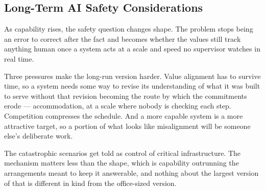 \subsection{Long-Term AI Safety Considerations}
\label{sec:6.3.5}
As capability rises, the safety question changes shape. The problem stops being an error to correct after the fact and becomes whether the values still track anything human once a system acts at a scale and speed no supervisor watches in real time.

Three pressures make the long-run version harder. Value alignment has to survive time, so a system needs some way to revise its understanding of what it was built to serve without that revision becoming the route by which the commitments erode — accommodation, at a scale where nobody is checking each step. Competition compresses the schedule. And a more capable system is a more attractive target, so a portion of what looks like misalignment will be someone else's deliberate work.

The catastrophic scenarios get told as control of critical infrastructure. The mechanism matters less than the shape, which is capability outrunning the arrangements meant to keep it answerable, and nothing about the largest version of that is different in kind from the office-sized version.
